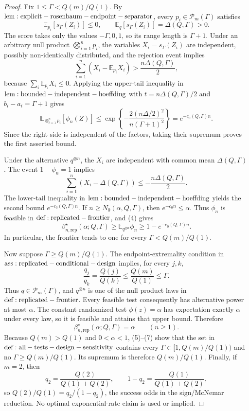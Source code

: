 \documentclass{article}
\begin{document}
\begin{proof}
Fix \(1\leq\Gamma<Q(m)/Q(1)\). By \({\rm lem:explicit-rosenbaum-endpoint-separator}\), every \(p_i\in\mathcal P_m(\Gamma)\) satisfies
\[
 \mathbb E_{p_i}[s_\Gamma(Z_i)]\leq0,\qquad \mathbb E_q[s_\Gamma(Z_i)]=\Delta(Q,\Gamma)>0.\tag{1}
\]
The score takes only the values \(-\Gamma,0,1\), so its range length is \(\Gamma+1\). Under an arbitrary null product \(\bigotimes_{i=1}^np_i\), the variables \(X_i=s_\Gamma(Z_i)\) are independent, possibly non-identically distributed, and the rejection event implies
\[
 \sum_{i=1}^n(X_i-\mathbb E_{p_i}X_i)>\frac{n\Delta(Q,\Gamma)}2,\tag{2}
\]
because \(\sum_i\mathbb E_{p_i}X_i\leq0\). Applying the upper-tail inequality in \({\rm lem:bounded-independent-hoeffding}\) with \(t=n\Delta(Q,\Gamma)/2\) and \(b_i-a_i=\Gamma+1\) gives
\[
 \mathbb E_{\otimes_{i=1}^np_i}[\phi_n(Z)]\leq\exp\left\{-\frac{2(n\Delta/2)^2}{n(\Gamma+1)^2}\right\}=e^{-c_0(Q,\Gamma)n}.\tag{3}
\]
Since the right side is independent of the factors, taking their supremum proves the first asserted bound.

Under the alternative \(q^{\otimes n}\), the \(X_i\) are independent with common mean \(\Delta(Q,\Gamma)\). The event \(1-\phi_n=1\) implies
\[
 \sum_{i=1}^n(X_i-\Delta(Q,\Gamma))\leq-\frac{n\Delta(Q,\Gamma)}2.\tag{4}
\]
The lower-tail inequality in \({\rm lem:bounded-independent-hoeffding}\) yields the second bound \(e^{-c_0(Q,\Gamma)n}\). If \(n\geq N_0(\alpha,Q,\Gamma)\), then \(e^{-c_0n}\leq\alpha\). Thus \(\phi_n\) is feasible in \({\rm def:replicated-frontier}\), and (4) gives
\[
 \beta_{n,\mathrm{rep}}^\star(\alpha;Q,\Gamma)\geq\mathbb E_{q^{\otimes n}}\phi_n\geq1-e^{-c_0(Q,\Gamma)n}.\tag{5}
\]
In particular, the frontier tends to one for every \(\Gamma<Q(m)/Q(1)\).

Now suppose \(\Gamma\geq Q(m)/Q(1)\). The endpoint-extremality condition in \({\rm ass:replicated-conditional-design}\) implies, for every \(j,k\),
\[
 \frac{q_j}{q_k}=\frac{Q(j)}{Q(k)}\leq\frac{Q(m)}{Q(1)}\leq\Gamma.\tag{6}
\]
Thus \(q\in\mathcal P_m(\Gamma)\), and \(q^{\otimes n}\) is one of the null product laws in \({\rm def:replicated-frontier}\). Every feasible test consequently has alternative power at most \(\alpha\). The constant randomized test \(\phi(z)=\alpha\) has expectation exactly \(\alpha\) under every law, so it is feasible and attains that upper bound. Therefore
\[
 \beta_{n,\mathrm{rep}}^\star(\alpha;Q,\Gamma)=\alpha\qquad(n\geq1).\tag{7}
\]
Because \(Q(m)>Q(1)\) and \(0<\alpha<1\), (5)--(7) show that the set in \({\rm def:all-tests-design-sensitivity}\) contains every \(\Gamma\in[1,Q(m)/Q(1))\) and no \(\Gamma\geq Q(m)/Q(1)\). Its supremum is therefore \(Q(m)/Q(1)\). Finally, if \(m=2\), then
\[
 q_2=\frac{Q(2)}{Q(1)+Q(2)},\qquad 1-q_2=\frac{Q(1)}{Q(1)+Q(2)},
\]
so \(Q(2)/Q(1)=q_2/(1-q_2)\), the success odds in the sign/McNemar reduction. No optimal exponential-rate claim is used or implied.
\end{proof}
\end{document}
